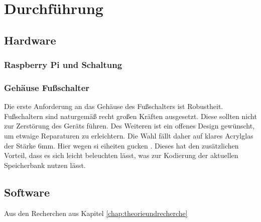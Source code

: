 \chapter{Durchführung}

\section{Hardware}

\subsection{Raspberry Pi und Schaltung}



\subsection{Gehäuse Fußschalter}

Die erste Anforderung an das Gehäuse des Fußschalters ist Robustheit. Fußschaltern sind naturgemäß recht großen Kräften ausgesetzt. Diese sollten nicht zur Zerstörung des Geräts führen.
Des Weiteren ist ein offenes Design gewünscht, um etwaige Reparaturen zu erleichtern. Die Wahl fällt daher auf klares Acrylglas {\LARGE der Stärke 6mm. Hier wegen si eiheiten gucken }. Dieses hat den zusätzlichen Vorteil, dass es sich leicht beleuchten lässt, was zur Kodierung der aktuellen Speicherbank nutzen lässt. 
\section{Software}

Aus den Recherchen aus Kapitel \ref{chap:theorieundrecherche} 
